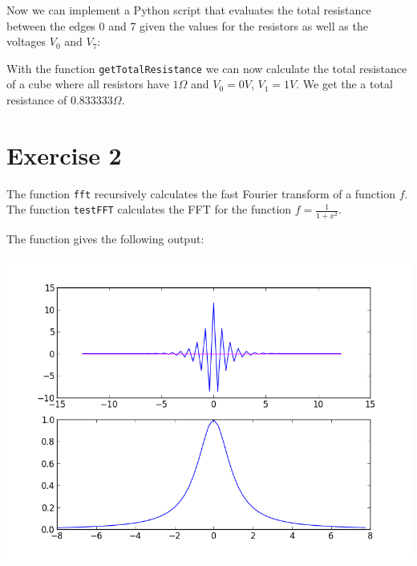 \documentclass[%
]
{scrartcl}
\theoremstyle{plain}
\begin{document}
Now we can implement a Python script that evaluates the total resistance between the edges 0 and 7 given the values for the resistors as well as the voltages $V_{0}$ and $V_{7}$:



With the function \texttt{getTotalResistance} we can now calculate the total resistance of a cube where all resistors have $1\Omega$ and $V_{0}=0V$, $V_{1}=1V$. We get the a total resistance of $0.833333\Omega$.

\section*{Exercise 2}

The function \texttt{fft} recursively calculates the fast Fourier transform of a function $f$. The function \texttt{testFFT} calculates the FFT for the function $f=\frac{1}{1+x^{2}}$.



The function gives the following output:

\begin{center}
\centering
\includegraphics[width=0.6\linewidth]{../fft.png}
\end{center}

%
\end{document}
